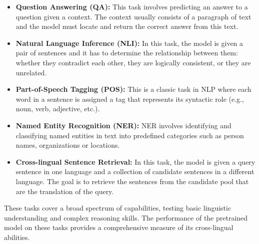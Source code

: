 \begin{itemize}
    
    \item \textbf{Question Answering (QA):} This task involves predicting an answer to a question given a context. The context usually consists of a paragraph of text and the model must locate and return the correct answer from this text.
    \item \textbf{Natural Language Inference (NLI):} In this task, the model is given a pair of sentences and it has to determine the relationship between them: whether they contradict each other, they are logically consistent, or they are unrelated.
    \item \textbf{Part-of-Speech Tagging (POS):} This is a classic task in NLP where each word in a sentence is assigned a tag that represents its syntactic role (e.g., noun, verb, adjective, etc.).
    \item \textbf{Named Entity Recognition (NER):} NER involves identifying and classifying named entities in text into predefined categories such as person names, organizations or locations.
    \item \textbf{Cross-lingual Sentence Retrieval:} In this task, the model is given a query sentence in one language and a collection of candidate sentences in a different language. The goal is to retrieve the sentences from the candidate pool that are the translation of the query.
\end{itemize}
    
These tasks cover a broad spectrum of capabilities, testing basic linguistic understanding and complex reasoning skills. The performance of the pretrained model on these tasks provides a comprehensive measure of its cross-lingual abilities.





